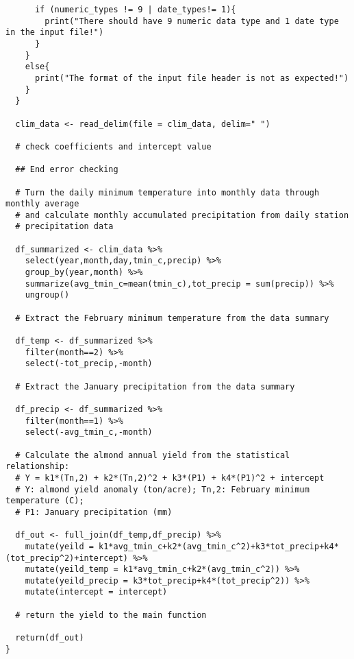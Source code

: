 \documentclass[
]{article}
\begin{document}
\begin{verbatim}
      if (numeric_types != 9 | date_types!= 1){
        print("There should have 9 numeric data type and 1 date type in the input file!")
      }
    }
    else{
      print("The format of the input file header is not as expected!")
    }
  }
  
  clim_data <- read_delim(file = clim_data, delim=" ")
  
  # check coefficients and intercept value
  
  ## End error checking
  
  # Turn the daily minimum temperature into monthly data through monthly average
  # and calculate monthly accumulated precipitation from daily station
  # precipitation data
  
  df_summarized <- clim_data %>% 
    select(year,month,day,tmin_c,precip) %>% 
    group_by(year,month) %>% 
    summarize(avg_tmin_c=mean(tmin_c),tot_precip = sum(precip)) %>% 
    ungroup()
  
  # Extract the February minimum temperature from the data summary
  
  df_temp <- df_summarized %>% 
    filter(month==2) %>% 
    select(-tot_precip,-month)
  
  # Extract the January precipitation from the data summary
  
  df_precip <- df_summarized %>% 
    filter(month==1) %>% 
    select(-avg_tmin_c,-month)
  
  # Calculate the almond annual yield from the statistical relationship:
  # Y = k1*(Tn,2) + k2*(Tn,2)^2 + k3*(P1) + k4*(P1)^2 + intercept
  # Y: almond yield anomaly (ton/acre); Tn,2: February minimum temperature (C); 
  # P1: January precipitation (mm)
  
  df_out <- full_join(df_temp,df_precip) %>% 
    mutate(yeild = k1*avg_tmin_c+k2*(avg_tmin_c^2)+k3*tot_precip+k4*(tot_precip^2)+intercept) %>% 
    mutate(yeild_temp = k1*avg_tmin_c+k2*(avg_tmin_c^2)) %>% 
    mutate(yeild_precip = k3*tot_precip+k4*(tot_precip^2)) %>% 
    mutate(intercept = intercept)
  
  # return the yield to the main function
  
  return(df_out)
}
\end{verbatim}
\end{document}

